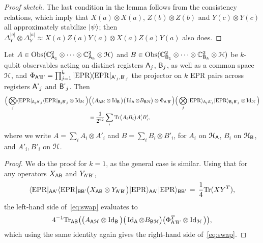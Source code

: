 \begin{proof}[Proof sketch]
The last condition in the lemma follows from the consistency relations, which imply that $X(a)\otimes X(a)$, $Z(b)\otimes Z(b)$ and $Y(c)\otimes Y(c)$ all approximately stabilize $|\psi\rangle$; then $\Delta_Y^{|a|} \otimes \Delta_Y^{|a|} \approx  X(a)Z(a)Y(a) \otimes X(a)Z(a)Y(a)$ also does. 
\end{proof}

\begin{claim}\label{claim:swap-tt}
Let $A\in \mathrm{Obs}({\mathbb C}^2_{{\textsf{A}}_1}\otimes \cdots\otimes {\mathbb C}^2_{{\textsf{A}}_k} \otimes \mathcal{H})$ and $B\in \mathrm{Obs}({\mathbb C}^2_{{\textsf{B}}_1}\otimes \cdots\otimes {\mathbb C}^2_{{\textsf{B}}_k}\otimes \mathcal{H})$ be $k$-qubit observables acting on distinct registers ${\textsf{A}}_j$, ${\textsf{B}}_j$, as well as a common space $\mathcal{H}$, and $\Phi_{{\textsf{A'B'}}} = \prod_{j=1}^k |{\rm EPR}\rangle\!\langle{\rm EPR}|_{{\textsf{A'}}_j,{\textsf{B'}}_j}$ the projector on $k$ EPR pairs across registers ${\textsf{A'}}_j$ and ${\textsf{B'}}_j$.  Then 
\begin{align}
 \Big(\bigotimes_j \langle{\rm EPR}|_{{\textsf{A}}_j{\textsf{A'}}_j}\langle{\rm EPR}|_{{\textsf{B}}_j{\textsf{B'}}_j} \otimes \mathop{\rm Id}\nolimits_{\mathcal{H}} \Big)&\Big(\big(A_{{\textsf{A}}\mathcal{H}} \otimes \mathop{\rm Id}\nolimits_{\textsf{B}}\big)\big( \mathop{\rm Id}\nolimits_{\textsf{A}}\otimes B _{{\textsf{B}}\mathcal{H}}\big)\otimes \Phi_{{\textsf{A'B'}}}\Big) \Big(\bigotimes_j |{\rm EPR}\rangle_{{\textsf{A}}_j{\textsf{A'}}_j}|{\rm EPR}\rangle_{{\textsf{B}}_j{\textsf{B'}}_j} \otimes \mathop{\rm Id}\nolimits_{\mathcal{H}}\Big)\notag\\
& = \frac{1}{2^{2k}}\sum_i \mbox{\rm Tr}\big(A_i B_i\big) A'_iB'_i,\label{eq:swap}
\end{align}
where we write $A = \sum_i A_i \otimes A'_i$ and $B=\sum_i B_i\otimes B'_i$, for $A_i$ on $\mathcal{H}_{\textsf{A}}$, $B_i$ on $\mathcal{H}_{{\textsf{B}}}$, and $A'_i,B'_i$ on $\mathcal{H}$.
\end{claim}


\begin{proof}
We do the proof for $k=1$, as the general case is similar. Using that for any operators $X_{{\textsf{AB}}} $ and $ Y_{{\textsf{A'B'}}}$, 
$$\langle{\rm EPR}|_{{\textsf{AA'}}}\langle{\rm EPR}|_{{\textsf{BB'}}} \big( X_{{\textsf{AB}}} \otimes Y_{{\textsf{A'B'}}} \big) |{\rm EPR}\rangle_{{\textsf{AA'}}}|{\rm EPR}\rangle_{{\textsf{BB'}}} \,=\, \frac{1}{4}\mbox{\rm Tr}(XY^T),$$
the left-hand side of~\eqref{eq:swap} evaluates to 
$$4^{-1} \mbox{\rm Tr}_{{\textsf{AB}}}\big( \big(A_{{\textsf{A}}\mathcal{H}} \otimes \mathop{\rm Id}\nolimits_{\textsf{B}}\big)\big( \mathop{\rm Id}\nolimits_{\textsf{A}}\otimes B _{{\textsf{B}}\mathcal{H}}\big)\big(\Phi_{{\textsf{A'B'}}}^T\otimes \mathop{\rm Id}\nolimits_{\mathcal{H}}\big)\big),$$
 which using the same identity again 
gives the right-hand side of~\eqref{eq:swap}.
\end{proof}

